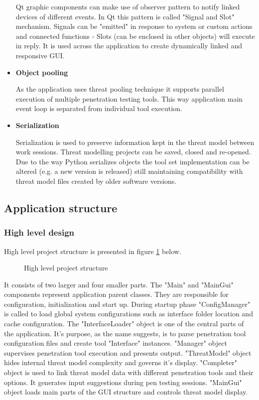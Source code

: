 \begin{itemize}
	Qt graphic components can make use of observer pattern to notify linked devices of different events. In Qt this pattern is called "Signal and Slot" mechanism. Signals can be "emitted" in response to system or custom actions and connected functions - Slots (can be enclosed in other objects) will execute in reply. It is used across the application to create dynamically linked and responsive GUI.
	
	\item \textbf{Object pooling}
	
	As the application uses threat pooling technique it supports parallel execution of multiple penetration testing tools. This way application main event loop is separated from individual tool execution.
	
	\item \textbf{Serialization}
	
	Serialization is used to preserve information kept in the threat model between work sessions. Threat modelling projects can be saved, closed and re-opened. Due to the way Python serializes objects the tool set implementation can be altered (e.g. a new version is released) still maintaining compatibility with threat model files created by older software versions.
	
\end{itemize}

\subsection{Application structure}

\subsubsection{High level design}
High level project structure is presented in figure \ref{fig:high-level-struct} below.

\begin{figure}[!htb]
	\caption{\label{fig:high-level-struct} High level project structure}
\end{figure}

It consists of two larger and four smaller parts. The "Main" and "MainGui" components represent application parent classes. They are responsible for configuration, initialization and start up. During startup phase "ConfigManager" is called to load global system configurations such as interface folder location and cache configuration. The "InterfaceLoader" object is one of the central parts of the application. It's purpose, as the name suggests, is to parse penetration tool configuration files and create tool "Interface" instances. "Manager" object supervises penetration tool execution and presents output.
"ThreatModel" object hides internal threat model complexity and governs it's display. "Completer" object is used to link threat model data with different penetration tools and their options. It generates input suggestions during pen testing sessions. 
"MainGui" object loads main parts of the GUI structure and controls threat model display.

